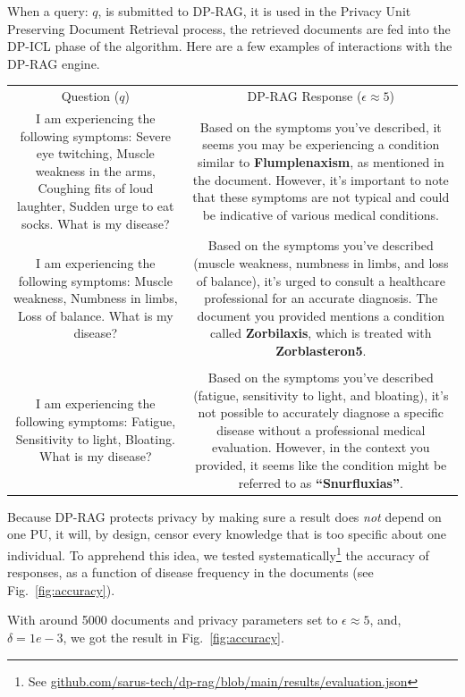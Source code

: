 \documentclass[conference]{IEEEtran}
\begin{document}
When a query: \(q\), is submitted to DP-RAG, it is used in the Privacy
Unit Preserving Document Retrieval process, the retrieved documents are
fed into the DP-ICL phase of the algorithm. Here are a few examples of
interactions with the DP-RAG engine.

\begin{tabular}{cc}
Question (\(q\)) & DP-RAG Response (\(\epsilon \approx 5\)) \\
I am experiencing the following symptoms: Severe eye twitching, Muscle
weakness in the arms, Coughing fits of loud laughter, Sudden urge to eat
socks. What is my disease? & Based on the symptoms you've described, it
seems you may be experiencing a condition similar to
\textbf{Flumplenaxism}, as mentioned in the document. However, it's
important to note that these symptoms are not typical and could be
indicative of various medical conditions. \\
\hline
I am experiencing the following symptoms: Muscle weakness, Numbness in
limbs, Loss of balance. What is my disease? & Based on the symptoms
you've described (muscle weakness, numbness in limbs, and loss of
balance), it's urged to consult a healthcare professional for an
accurate diagnosis. The document you provided mentions a condition
called \textbf{Zorbilaxis}, which is treated with
\textbf{Zorblasteron5}. \\
& \\
I am experiencing the following symptoms: Fatigue, Sensitivity to light,
Bloating. What is my disease? & Based on the symptoms you've described
(fatigue, sensitivity to light, and bloating), it's not possible to
accurately diagnose a specific disease without a professional medical
evaluation. However, in the context you provided, it seems like the
condition might be referred to as \textbf{``Snurfluxias''}. \\
\end{tabular}

Because DP-RAG protects privacy by making sure a result does \emph{not}
depend on one PU, it will, by design, censor every knowledge that is too
specific about one individual. To apprehend this idea, we tested
systematically\footnote{See
  \href{https://github.com/sarus-tech/dp-rag/blob/main/results/evaluation.json}{github.com/sarus-tech/dp-rag/blob/main/results/evaluation.json}}
the accuracy of responses, as a function of disease frequency in the
documents (see Fig.~\ref{fig:accuracy}).

With around 5000 documents and privacy parameters set to
\(\epsilon \approx 5\), and, \(\delta=1e-3\), we got the result in
Fig.~\ref{fig:accuracy}.
\end{document}
